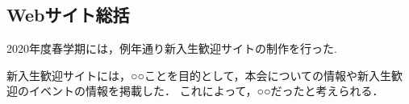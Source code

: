 \subsection*{Webサイト総括}


2020年度春学期には，例年通り新入生歓迎サイトの制作を行った.

新入生歓迎サイトには，○○ことを目的として，本会についての情報や新入生歓迎のイベントの情報を掲載した．
これによって，○○だったと考えられる．

